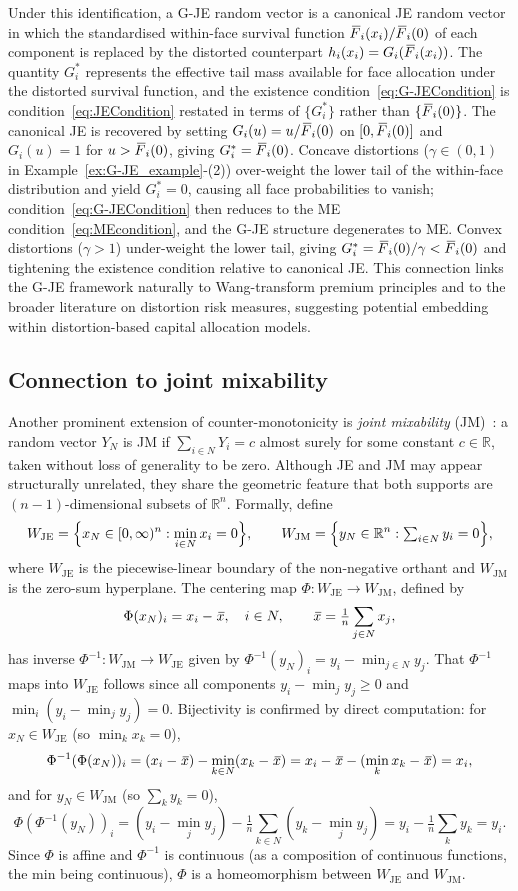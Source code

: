 \documentclass[letterpaper,12pt]{article}
\numberwithin{equation}{section}
\newcommand{\N}{{N}}
\newcommand{\F}{\,\overline{\kern-0.175em F\kern-0em}}
\newcommand{\xb}{\,\overline{\kern-0.125em x\kern-0em}}
\begin{document}
{Under this identification, a G-JE random vector is a canonical JE random
vector in which the standardised within-face survival function
$\F_i(x_i)/\F_i(0)$ of each component is replaced by the distorted
counterpart $h_i(x_i)=G_i(\F_i(x_i))$. The quantity $G_i^*$ represents
the effective tail mass available for face allocation under the distorted
survival function, and the existence condition~\eqref{eq:G-JECondition} is
condition~\eqref{eq:JECondition} restated in terms of $\{G_i^*\}$ rather than
$\{\F_i(0)\}$. The canonical JE is recovered by setting
$G_i(u)=u/\F_i(0)$ on $[0,\F_i(0)]$ and $G_i(u)=1$ for
$u>\F_i(0)$, giving $G_i^*=\F_i(0)$. Concave distortions
($\gamma\in(0,1)$ in Example~\ref{ex:G-JE_example}-(2)) over-weight the
lower tail of the within-face distribution and yield $G_i^*=0$, causing all
face probabilities to vanish; condition~\eqref{eq:G-JECondition} then reduces
to the ME condition~\eqref{eq:MEcondition}, and the G-JE structure degenerates
to ME. Convex distortions ($\gamma>1$) under-weight the lower tail, giving
$G_i^*=\F_i(0)/\gamma<\F_i(0)$ and tightening the existence
condition relative to canonical JE. This connection links the G-JE framework
naturally to Wang-transform premium principles and to the broader literature
on distortion risk measures, suggesting potential embedding within
distortion-based capital allocation models.

\subsection{Connection to joint mixability}
\label{subsec:JM}

Another prominent extension of counter-monotonicity is \emph{joint
mixability} (JM)~\citep{Wang2016}: a random vector $Y_\N$ is JM if
$\sum_{i\in\N}Y_i=c$ almost surely for some constant $c\in\mathbb{R}$,
taken without loss of generality to be zero. Although JE and JM may appear
structurally unrelated, they share the geometric feature that both supports
are $(n-1)$-dimensional subsets of $\mathbb{R}^n$. Formally, define
\[
W_\mathrm{JE}=\Bigl\{x_\N\in[0,\infty)^n:\min_{i\in\N}x_i=0\Bigr\},
\qquad
W_\mathrm{JM}=\Bigl\{y_\N\in\mathbb{R}^n:\textstyle\sum_{i\in\N}y_i=0\Bigr\},
\]
where $W_\mathrm{JE}$ is the piecewise-linear boundary of the non-negative
orthant and $W_\mathrm{JM}$ is the zero-sum hyperplane. The centering map
$\Phi:W_\mathrm{JE}\to W_\mathrm{JM}$, defined by
\[
\Phi(x_\N)_i=x_i-\xb,\quad i\in\N,\qquad
\xb=\tfrac{1}{n}\sum_{j\in\N}x_j,
\]
has inverse $\Phi^{-1}:W_\mathrm{JM}\to W_\mathrm{JE}$ given by
$\Phi^{-1}(y_\N)_i=y_i-\min_{j\in\N}y_j$. That $\Phi^{-1}$ maps into
$W_\mathrm{JE}$ follows since all components $y_i-\min_j y_j\ge0$ and
$\min_i(y_i-\min_j y_j)=0$. Bijectivity is confirmed by direct computation:
for $x_\N\in W_\mathrm{JE}$ (so $\min_k x_k=0$),
\[
\Phi^{-1}(\Phi(x_\N))_i
=(x_i-\xb)-\min_{k\in\N}(x_k-\xb)
=x_i-\xb-(\min_k x_k-\xb)
=x_i,
\]
and for $y_\N\in W_\mathrm{JM}$ (so $\sum_k y_k=0$),
\[
\Phi(\Phi^{-1}(y_\N))_i
=(y_i-\min_j y_j)
-\tfrac{1}{n}\sum_{k\in\N}(y_k-\min_j y_j)
=y_i-\tfrac{1}{n}\sum_k y_k
=y_i.
\]
Since $\Phi$ is affine and $\Phi^{-1}$ is continuous (as a composition of
continuous functions, the min being continuous), $\Phi$ is a homeomorphism
between $W_\mathrm{JE}$ and $W_\mathrm{JM}$.

}
\end{document}
